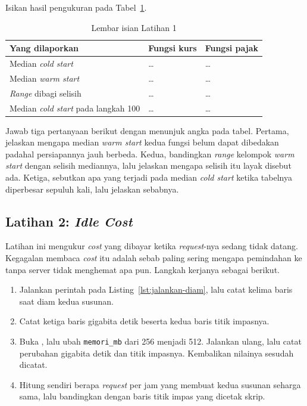 Isikan hasil pengukuran pada Tabel~\ref{tab:lat1serverless-hasil}.

\begin{table}[htbp]
  \centering
  \caption{Lembar isian Latihan 1}
  \label{tab:lat1serverless-hasil}
  \begin{tabularx}{\textwidth}{|X|l|l|}
    \hline
    \textbf{Yang dilaporkan} & \textbf{Fungsi kurs} & \textbf{Fungsi pajak} \\
    \hline
    Median \textit{cold start} & \dots & \dots \\
    \hline
    Median \textit{warm start} & \dots & \dots \\
    \hline
    \textit{Range} dibagi selisih & \dots & \dots \\
    \hline
    Median \textit{cold start} pada langkah 100 & \dots & \dots \\
    \hline
  \end{tabularx}
\end{table}

Jawab tiga pertanyaan berikut dengan menunjuk angka pada tabel. Pertama,
jelaskan mengapa median \textit{warm start} kedua fungsi belum dapat dibedakan
padahal persiapannya jauh berbeda. Kedua, bandingkan \textit{range} kelompok
\textit{warm start} dengan selisih mediannya, lalu jelaskan mengapa selisih itu layak disebut ada.
Ketiga, sebutkan apa yang terjadi pada median \textit{cold start} ketika
tabelnya diperbesar sepuluh kali, lalu jelaskan sebabnya.

\subsection*{Latihan 2: \textit{Idle Cost}}

Latihan ini mengukur \textit{cost} yang dibayar ketika \textit{request}-nya sedang tidak
datang. Kegagalan membaca \textit{cost} itu adalah sebab paling sering mengapa
pemindahan ke tanpa server tidak menghemat apa pun. Langkah kerjanya sebagai
berikut.

\begin{enumerate}
  \item Jalankan perintah pada Listing~\ref{lst:jalankan-diam}, lalu catat
    kelima baris saat diam kedua susunan.
  \item Catat ketiga baris gigabita detik beserta kedua baris titik impasnya.
  \item Buka , lalu ubah
    \texttt{memori\_mb} dari 256 menjadi 512. Jalankan ulang, lalu catat
    perubahan gigabita detik dan titik impasnya. Kembalikan nilainya sesudah
    dicatat.
  \item Hitung sendiri berapa \textit{request} per jam yang membuat kedua susunan
    seharga sama, lalu bandingkan dengan baris titik impas yang dicetak skrip.
\end{enumerate}

